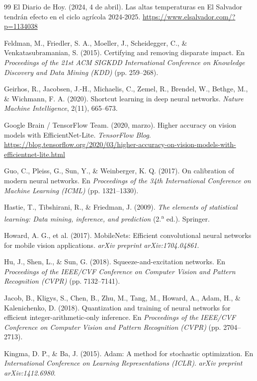 \begin{singlespace}
\begin{thebibliography}{99}
El Diario de Hoy. (2024, 4 de abril). Las altas temperaturas en El Salvador tendr\'an efecto en el ciclo agr\'icola 2024-2025. \url{https://www.elsalvador.com/?p=1134038}

Feldman, M., Friedler, S. A., Moeller, J., Scheidegger, C., \& Venkatasubramanian, S. (2015). Certifying and removing disparate impact. En \textit{Proceedings of the 21st ACM SIGKDD International Conference on Knowledge Discovery and Data Mining (KDD)} (pp. 259--268).

Geirhos, R., Jacobsen, J.-H., Michaelis, C., Zemel, R., Brendel, W., Bethge, M., \& Wichmann, F. A. (2020). Shortcut learning in deep neural networks. \textit{Nature Machine Intelligence}, 2(11), 665--673.

Google Brain / TensorFlow Team. (2020, marzo). Higher accuracy on vision models with EfficientNet-Lite. \textit{TensorFlow Blog}. \url{https://blog.tensorflow.org/2020/03/higher-accuracy-on-vision-models-with-efficientnet-lite.html}

Guo, C., Pleiss, G., Sun, Y., \& Weinberger, K. Q. (2017). On calibration of modern neural networks. En \textit{Proceedings of the 34th International Conference on Machine Learning (ICML)} (pp. 1321--1330).

Hastie, T., Tibshirani, R., \& Friedman, J. (2009). \textit{The elements of statistical learning: Data mining, inference, and prediction} (2.\textsuperscript{a} ed.). Springer.

Howard, A. G., et al. (2017). MobileNets: Efficient convolutional neural networks for mobile vision applications. \textit{arXiv preprint arXiv:1704.04861}.

Hu, J., Shen, L., \& Sun, G. (2018). Squeeze-and-excitation networks. En \textit{Proceedings of the IEEE/CVF Conference on Computer Vision and Pattern Recognition (CVPR)} (pp. 7132--7141).

Jacob, B., Kligys, S., Chen, B., Zhu, M., Tang, M., Howard, A., Adam, H., \& Kalenichenko, D. (2018). Quantization and training of neural networks for efficient integer-arithmetic-only inference. En \textit{Proceedings of the IEEE/CVF Conference on Computer Vision and Pattern Recognition (CVPR)} (pp. 2704--2713).

Kingma, D. P., \& Ba, J. (2015). Adam: A method for stochastic optimization. En \textit{International Conference on Learning Representations (ICLR)}. \textit{arXiv preprint arXiv:1412.6980}.


\end{thebibliography}
\end{singlespace}
